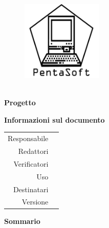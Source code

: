 \thispagestyle{empty}

\begin{figure}
	\centering
	\includegraphics[width=145px]{../template/images/logo-pentasoft}
\end{figure}

\hspace{2pt}

\begin{center}
	\textbf{\Large \documentName}\\[0.2cm]
	\textbf{\Large Progetto \projectName}
\end{center}

\vspace{2pt}

\begin{center}
	\groupEmail
\end{center}

\vspace{2pt}

\begin{center}
	\textbf{Informazioni sul documento}
\end{center}

\begin{table}[H]
	\centering
	\renewcommand{\arraystretch}{1.4}
	\begin{tabular}{r|l}
		Responsabile & \documentApprovers\vspace{2.5pt}\\
		Redattori & \documentEditors\vspace{2.5pt}\\
		Verificatori & \documentVerifiers\vspace{2.5pt}\\
		Uso & \documentUsage\vspace{2.5pt}\\
		Destinatari & \documentAddressee\vspace{2.5pt}\\
		Versione & \documentVersion\\
	\end{tabular}
\end{table}

\vspace{10pt}

\begin{center}
	\textbf{Sommario}\\\documentSummary
\end{center}